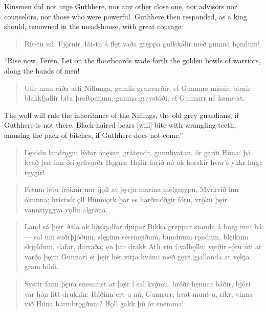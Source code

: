 \bvb Kinsmen did not urge Guthhere, nor any other close one, nor advisors nor counselors, nor those who were powerful. Guthhere then responded, as a king should, renowned in the mead-house, with great courage:

\begin{verse}
\bva Rís-tu nú, Fjǫrnir, \hld lát-tu á flęt vaða
gręppa gullskálir \hld með gumna hǫndum! 
\end{verse}

\bvb “Rise now, Feren. Let on the floorboards wade forth the golden bowls of warriors, along the hands of men!

\begin{verse}
\bva Ulfr mun ráða \hld arfi Niflunga,
gamlir granvarðir, \hld ef Gunnars missir,
birnir blakkfjallir \hld bíta þreftǫnnum,
gamna gręystóði, \hld ef Gunnarr né kømr-at. 
\end{verse}

\bvb The wolf will rule the inheritance of the Niflings, the old grey guardians, if Guthhere is not there. Black-haired bears [will] bite with wrangling teeth, amusing the pack of bitches, if Guthhere does not come.”

\begin{verse}
\bva Lęiddu landrǫgni \hld lýðar ónęisir,
grátęndr, gunnhvatan, \hld ór garði Húna;
þá kvað þat inn ǿri \hld ęrfivǫrðr Hǫgna:
Hęilir farið nú ok horskir \hld hvar’s ykkr hugr tęygir! 
\end{verse}

\begin{verse}
\bva Fetum létu frǿknir \hld um fjǫll at þyrja
marina mélgręypu, \hld Myrkvið inn ókunna;
hristisk ǫll Húnmǫrk \hld þar es harðmóðgir fóru,
vrǫ́ku þęir vannstyggva \hld vǫllu algrǿna. 
\end{verse}

\begin{verse}
\bva Land sá þęir Atla \hld ok liðskjalfar djúpar
Bikka greppar standa \hld á borg inni há—
sal um suðrþjóðum, \hld slęginn sessmęiðum,
bundnum rǫndum, \hld blęikum skjǫldum,
dafar, darraða; \hld ęn þar drakk Atli
vín í valhǫllu; \hld vęrðir sǫ́tu úti
at varða þęim Gunnari \hld ef þęir hér vitja kvǿmi
með gęiri gjallanda \hld at vękja gram hildi. 
\end{verse}

\begin{verse}
\bva Systir fann þęira snemmst \hld at þęir í sal kvǫ́mu,
brǿðr hęnnar báðir, \hld bjóri var hón lítt drukkin:
Ráðinn ert-u nú, Gunnarr, \hld hvat munt-u, ríkr, vinna
við Húna harmbrǫgðum? \hld Hǫll gakk þú ór snemma! 
\end{verse}

